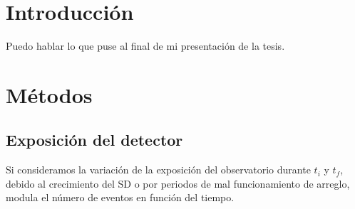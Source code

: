 
	\section{Introducción}
		Puedo hablar lo que puse al final de mi presentación de la tesis.

	\section{Métodos}

	\subsection{Exposición del detector}

	Si consideramos la variación de la exposición del observatorio durante $t_{i}$ y $t_f$, debido al crecimiento del SD o por periodos de mal funcionamiento de arreglo, modula el número de 	eventos en función del tiempo. 
	
